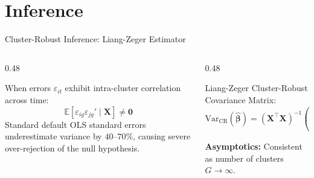 \documentclass[aspectratio=169, 9pt]{beamer}
\begin{document}
\section{Inference}
\begin{frame}{Cluster-Robust Inference: Liang-Zeger Estimator}
    \begin{columns}[t]
        \begin{column}{0.48\textwidth}
            \par\vspace{0.2em}
            \scriptsize
            When errors $\varepsilon_{it}$ exhibit intra-cluster correlation across time:
            \begin{equation*}
                \mathbb{E}[\varepsilon_{ig} \varepsilon_{jg}' \mid \mathbf{X}] \neq \mathbf{0}
            \end{equation*}
            Standard default OLS standard errors underestimate variance by $40\text{--}70\%$, causing severe over-rejection of the null hypothesis.
        \end{column}
        \begin{column}{0.48\textwidth}
            \par\vspace{0.2em}
            \scriptsize
            Liang-Zeger Cluster-Robust Covariance Matrix:
            \begin{equation*}
                \widehat{\mathrm{Var}}_{\mathrm{CR}}(\hat{\boldsymbol{\beta}}) = (\mathbf{X}^\top \mathbf{X})^{-1} \left( \frac{G}{G-1} \frac{N-1}{N-K} \sum_{g=1}^G \mathbf{X}_g^\top \hat{\mathbf{e}}_g \hat{\mathbf{e}}_g^\top \mathbf{X}_g \right) (\mathbf{X}^\top \mathbf{X})^{-1}
            \end{equation*}
            \vspace{0.1em}
            \begin{takeaway}
                \textbf{Asymptotics:} Consistent as number of clusters $G \to \infty$.
            \end{takeaway}
        \end{column}
    \end{columns}
\end{frame}

\end{document}
